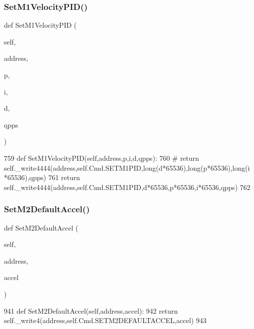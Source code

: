 \subsubsection{\texorpdfstring{Set\+M1\+Velocity\+P\+I\+D()}{SetM1VelocityPID()}}
{\footnotesize\ttfamily def Set\+M1\+Velocity\+P\+ID (\begin{DoxyParamCaption}\item[{}]{self,  }\item[{}]{address,  }\item[{}]{p,  }\item[{}]{i,  }\item[{}]{d,  }\item[{}]{qpps }\end{DoxyParamCaption})}


\begin{DoxyCode}
759     \textcolor{keyword}{def }SetM1VelocityPID(self,address,p,i,d,qpps):
760 \textcolor{comment}{#       return self.\_write4444(address,self.Cmd.SETM1PID,long(d*65536),long(p*65536),long(i*65536),qpps)}
761         \textcolor{keywordflow}{return} self.\_write4444(address,self.Cmd.SETM1PID,d*65536,p*65536,i*65536,qpps)
762 
\end{DoxyCode}
\mbox{\label{classtoxic__hardware_1_1roboclaw__3_1_1Roboclaw_a039c9127b396a47d39682cf528d66fd4}} 
\subsubsection{\texorpdfstring{Set\+M2\+Default\+Accel()}{SetM2DefaultAccel()}}
{\footnotesize\ttfamily def Set\+M2\+Default\+Accel (\begin{DoxyParamCaption}\item[{}]{self,  }\item[{}]{address,  }\item[{}]{accel }\end{DoxyParamCaption})}


\begin{DoxyCode}
941     \textcolor{keyword}{def }SetM2DefaultAccel(self,address,accel):
942         \textcolor{keywordflow}{return} self.\_write4(address,self.Cmd.SETM2DEFAULTACCEL,accel)
943 
\end{DoxyCode}
\mbox{\label{classtoxic__hardware_1_1roboclaw__3_1_1Roboclaw_abc897b52a6653ae79b5c7c193a88345c}} 
